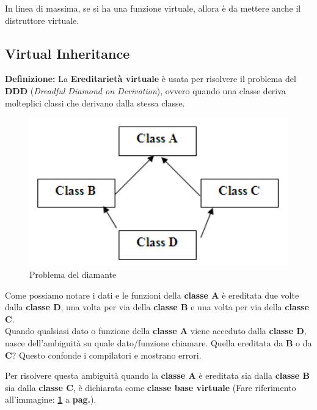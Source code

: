 \textsf{\small In linea di massima, se si ha una funzione virtuale, allora è da mettere anche il distruttore virtuale.} \break

\subsection{Virtual Inheritance}

\textsf{\small \textbf{Definizione:} La \textbf{Ereditarietà virtuale} è usata per risolvere il problema del \textbf{DDD} (\emph{Dreadful Diamond on Derivation}), ovvero quando una classe deriva molteplici classi che derivano dalla stessa classe.} \\

\begin{figure}[H]
	\centering
	\includegraphics[width=1\textwidth, height=1\textheight, keepaspectratio]{./imgs/diamond_problem2.png}
	\caption{Problema del diamante}
	\label{fig:diamond_problem}
\end{figure}

\textsf{\small Come possiamo notare i dati e le funzioni della \textbf{classe A} è ereditata due volte dalla \textbf{classe D}, una volta per via della \textbf{classe B} e una volta per via della \textbf{classe C}.} \\

\textsf{\small Quando qualsiasi dato o funzione della \textbf{classe A} viene acceduto dalla \textbf{classe D}, nasce dell'ambiguità su quale dato/funzione chiamare. Quella ereditata da \textbf{B} o da \textbf{C}? Questo confonde i compilatori e mostrano errori.}

\textsf{\small Per risolvere questa ambiguità quando la \textbf{classe A} è ereditata sia dalla \textbf{classe B} sia dalla \textbf{classe C}, è dichiarata come \textbf{classe base virtuale} (Fare riferimento all'immagine: \textbf{\ref{fig:diamond_problem}} a \textbf{pag.\pageref{fig:diamond_problem}}).}

